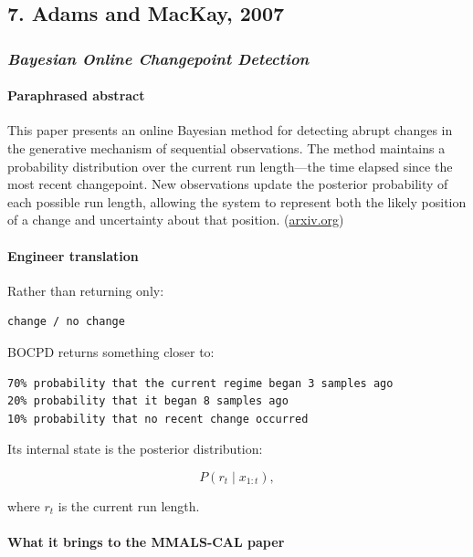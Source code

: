 \subsection{7. Adams and MacKay, 2007}\label{adams-and-mackay-2007}

\subsubsection{\texorpdfstring{\emph{Bayesian Online Changepoint Detection}}{Bayesian Online Changepoint Detection}}\label{bayesian-online-changepoint-detection}

\paragraph{Paraphrased abstract}\label{paraphrased-abstract-6}

This paper presents an online Bayesian method for detecting abrupt changes in the generative mechanism of sequential observations. The method maintains a probability distribution over the current run length---the time elapsed since the most recent changepoint. New observations update the posterior probability of each possible run length, allowing the system to represent both the likely position of a change and uncertainty about that position. (\href{https://arxiv.org/abs/0710.3742?utm_source=chatgpt.com}{arxiv.org})

\paragraph{Engineer translation}\label{engineer-translation-6}

Rather than returning only:

\begin{lstlisting}
change / no change
\end{lstlisting}

BOCPD returns something closer to:

\begin{lstlisting}
70% probability that the current regime began 3 samples ago
20% probability that it began 8 samples ago
10% probability that no recent change occurred
\end{lstlisting}

Its internal state is the posterior distribution:

\[
P(r_t\mid x_{1:t}),
\]

where \(r_t\) is the current run length.

\paragraph{What it brings to the MMALS-CAL paper}\label{what-it-brings-to-the-mmals-cal-paper-6}

